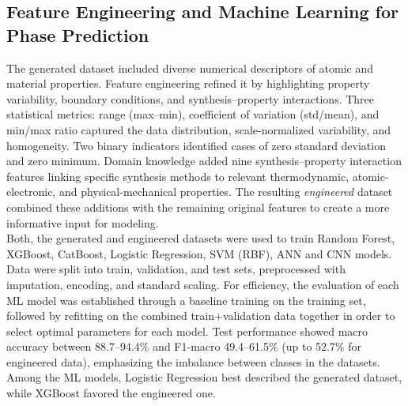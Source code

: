 \subsection*{Feature Engineering and Machine Learning for Phase Prediction}
The generated dataset included diverse numerical descriptors of atomic and material properties. Feature engineering refined it by highlighting property variability, boundary conditions, and synthesis–property interactions. Three statistical metrics: range (max–min), coefficient of variation (std/mean), and min/max ratio captured the data distribution, scale-normalized variability, and homogeneity. Two binary indicators identified cases of zero standard deviation and zero minimum. Domain knowledge added nine synthesis–property interaction features linking specific synthesis methods to relevant thermodynamic, atomic-electronic, and physical-mechanical properties. The resulting \textit{engineered} dataset combined these additions with the remaining original features to create a more informative input for modeling.\\

\noindent Both, the generated and engineered datasets were used to train Random Forest, XGBoost, CatBoost, Logistic Regression, SVM (RBF), ANN and CNN models. Data were split into train, validation, and test sets, preprocessed with imputation, encoding, and standard scaling. For efficiency, the evaluation of each ML model was established through a baseline training on the training set, followed by refitting on the combined train+validation data together in order to select optimal parameters for each model. Test performance showed macro accuracy between 88.7–94.4\% and F1-macro 49.4–61.5\% (up to 52.7\% for engineered data), emphasizing the imbalance between classes in the datasets. Among the ML models, Logistic Regression best described the generated dataset, while XGBoost favored the engineered one.

